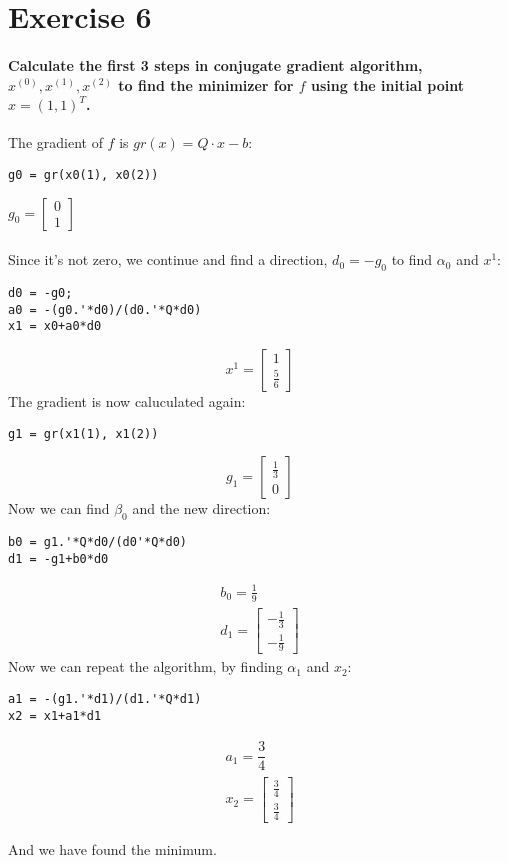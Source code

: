 \documentclass[Main]{subfiles}
\begin{document}
\section*{Exercise 6}

\paragraph{Calculate the first 3 steps in conjugate gradient algorithm, $x^{(0)}, x^{(1)}, x^{(2)}$ to find the minimizer for $f$ using the initial point $x = (1,1)^T$.}

The gradient of $f$ is $gr(x) = Q \cdot x-b$:
\begin{lstlisting}[caption=Gradient, style=Code-Matlab, label=lst:CH6-1]
g0 = gr(x0(1), x0(2))
\end{lstlisting}

$ g_0 =  
\begin{bmatrix}
0 \\ 
1
\end{bmatrix} $
\\
\\
Since it's not zero, we continue and find a direction, $d_0 = -g_0$ to find $\alpha_0$ and $x^1$:

\begin{lstlisting}[caption=Finding $x^1$, style=Code-Matlab, label=lst:CH6-2]
d0 = -g0;
a0 = -(g0.'*d0)/(d0.'*Q*d0)
x1 = x0+a0*d0
\end{lstlisting}

\[
x^1=
\begin{bmatrix}
1\\
\frac{5}{6}
\end{bmatrix}
\]
The gradient is now caluculated again:
\begin{lstlisting}[caption=$Gradient_1$, style=Code-Matlab, label=lst:CH6-3]
g1 = gr(x1(1), x1(2))
\end{lstlisting}
\[g_1 = \begin{bmatrix}
\frac{1}{3} \\0
\end{bmatrix}\]
Now we can find $\beta_0$ and the new direction:
\begin{lstlisting}[caption=New direction and $\beta$, style=Code-Matlab, label=lst:CH6-4]
b0 = g1.'*Q*d0/(d0'*Q*d0)
d1 = -g1+b0*d0
\end{lstlisting}
\begin{align*}
b_0 = \frac{1}{9}\\
d_1 = 
\begin{bmatrix}
-\frac{1}{3} \\
-\frac{1}{9}
\end{bmatrix}
\end{align*}
Now we can repeat the algorithm, by finding $\alpha_1$ and $x_2$:

\begin{lstlisting}[style=Code-Matlab, label=lst:CH6-5]
a1 = -(g1.'*d1)/(d1.'*Q*d1)
x2 = x1+a1*d1
\end{lstlisting}
\begin{align*}
a_1 = \dfrac{3}{4} \\
x_2 = 
\begin{bmatrix}
\frac{3}{4} \\
\frac{3}{4}
\end{bmatrix}
\end{align*}

And we have found the minimum.
\end{document}
